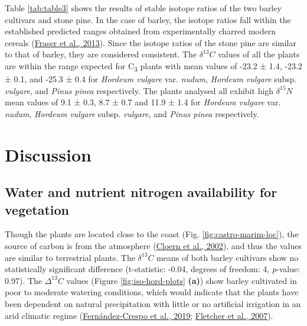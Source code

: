 \documentclass[preprint, 3p, authoryear]{elsarticle} %
\begin{document}
Table \ref{tab:table3} shows the results of stable isotope ratios of the two barley cultivars and stone pine. In the case of barley, the isotope ratios fall within the established predicted ranges obtained from experimentally charred modern cereals (\protect\hyperlink{ref-fraser_etal13a}{Fraser et al., 2013}). Since the isotope ratios of the stone pine are similar to that of barley, they are considered consistent. The \(\delta ^{13}C\) values of all the plants are within the range expected for C\textsubscript{3} plants with mean values of -23.2 ± 1.4\text{\textperthousand}, -23.2 ± 0.1\text{\textperthousand}, and -25.3 ± 0.4\text{\textperthousand} for \emph{Hordeum vulgare} var. \emph{nudum}, \emph{Hordeum vulgare} subsp. \emph{vulgare}, and \emph{Pinus pinea} respectively. The plants analysed all exhibit high \(\delta ^{15}N\) mean values of 9.1 ± 0.3\text{\textperthousand}, 8.7 ± 0.7\text{\textperthousand} and 11.9 ± 1.4\text{\textperthousand} for \emph{Hordeum vulgare} var. \emph{nudum}, \emph{Hordeum vulgare} subsp. \emph{vulgare}, and \emph{Pinus pinea} respectively.

\hypertarget{discussion}{%
\section{Discussion}\label{discussion}}

\hypertarget{water-and-nutrient-nitrogen-availability-for-vegetation}{%
\subsection{Water and nutrient nitrogen availability for vegetation}\label{water-and-nutrient-nitrogen-availability-for-vegetation}}

Though the plants are located close to the coast (Fig. \ref{fig:castro-marim-loc}), the source of carbon is from the atmosphere (\protect\hyperlink{ref-cloern_etal02}{Cloern et al., 2002}), and thus the values are similar to terrestrial plants. The \(\delta ^{13}C\) means of both barley cultivars show no statistically significant difference (t-statistic: -0.04, degrees of freedom: 4, \emph{p}-value: 0.97). The \(\Delta ^{13}C\) values (Figure \ref{fig:iso-hord-plots} \textbf{(a)}) show barley cultivated in poor to moderate watering conditions, which would indicate that the plants have been dependent on natural precipitation with little or no artificial irrigation in an arid climatic regime (\protect\hyperlink{ref-fernandez-crespo_etal19}{Fernández-Crespo et al., 2019}; \protect\hyperlink{ref-fletcher_etal07}{Fletcher et al., 2007}).
\end{document}
